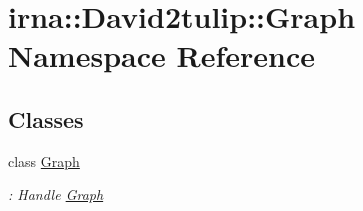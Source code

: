 \hypertarget{namespaceirna_1_1David2tulip_1_1Graph}{
\section{irna\-:\-:\-David2tulip\-:\-:\-Graph \-Namespace \-Reference}
\label{namespaceirna_1_1David2tulip_1_1Graph}
}
\subsection*{\-Classes}
\begin{DoxyCompactItemize}
\item 
class \hyperlink{classirna_1_1David2tulip_1_1Graph_1_1Graph}{\-Graph}
\begin{DoxyCompactList}\small\item\em \-: \-Handle \hyperlink{classirna_1_1David2tulip_1_1Graph_1_1Graph}{\-Graph} \end{DoxyCompactList}\end{DoxyCompactItemize}
